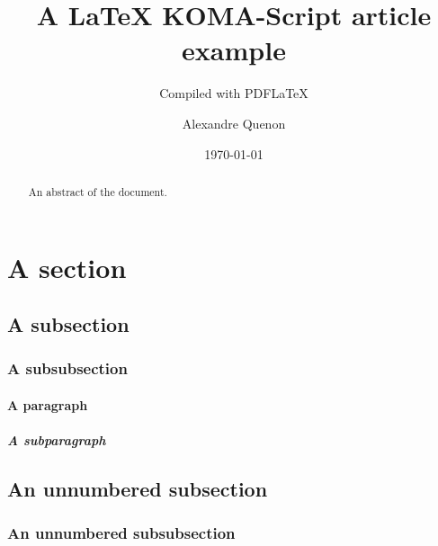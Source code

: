 \documentclass[fontsize=11pt, paper=portait,A4]{scrartcl}
\title{A \LaTeX{} KOMA-Script article example}
\subtitle{Compiled with PDF\LaTeX{}}
\author{Alexandre Quenon}
\date{\today}
\begin{document}

\maketitle

\tableofcontents


\begin{abstract}
	An abstract of the document.
	
	\lipsum[1-2]
\end{abstract}


\section{A section}

	\lipsum[1]
	
	
	\subsection{A subsection}
	
		\lipsum[2]
		
		
		\subsubsection{A subsubsection}
		
			\lipsum[3]
			
			
			\paragraph{A paragraph}
			
				\lipsum[4]
				
				
				\subparagraph{A subparagraph}
				
					\lipsum[5]
				
				
					
						\lipsum[6]



	\lipsum[1]
	
	
	\subsection*{An unnumbered subsection}
	
		\lipsum[2]
		
		
		\subsubsection*{An unnumbered subsubsection}
			
			\lipsum[3]



\end{document}
